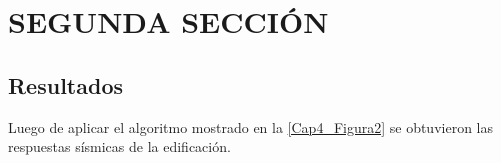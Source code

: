 \section{SEGUNDA SECCIÓN}

	\subsection{Resultados} \label{subsection:Resul_DFV}

Luego de aplicar el algoritmo mostrado en la \autoref{Cap4_Figura2} se obtuvieron las respuestas sísmicas de la edificación. 



